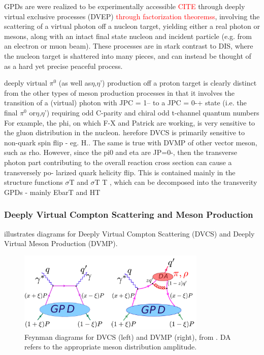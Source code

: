         GPDs are were realized to be experimentally accessible \textcolor{red}{CITE} through deeply virtual exclusive processes (DVEP) \textcolor{red}{through factorization theoremss}, involving the scattering of a virtual photon off a nucleon target, yielding either a real photon or mesons, along with an intact final state nucleon and incident particle (e.g. from an electron or muon beam). These processes are in stark contrast to DIS, where the nucleon target is shattered into many pieces, and can instead be thought of as a hard yet precise peaceful process. 


                     deeply
            virtual $\pi^0$ (as well as$\eta$,$\eta$') production off a proton target is clearly distinct from the other
            types of meson production processes in that it involves the transition of a (virtual) photon
            with JPC = 1– to a JPC = 0-+ state (i.e. the final $\pi^0$ or$\eta$,$\eta$’) requiring odd C-parity and
            chiral odd t-channel quantum numbers
For example, the phi, on which F-X and Patrick are
            working, is very sensitive to the gluon distribution in the nucleon.
herefore DVCS is
            primarily sensitive to non-quark spin flip - eg. H.. The same is true with DVMP of other
            vector meson, such as rho. However, since the pi0 and eta are JP=0-, then the transverse
            photon part contributing to the overall reaction cross section can cause a transversely po-
            larized quark helicity flip. This is contained mainly in the structure functions $\sigma$T and $\sigma$T T ,
            which can be decomposed into the transverity GPDs - mainly EbarT and HT
            

        \subsubsection*{Deeply Virtual Compton Scattering and Meson Production}
         illustrates diagrams for Deeply Virtual Compton Scattering (DVCS) and Deeply Virtual Meson Production (DVMP). 
    
        \begin{figure}[H]
            \centering
            \includegraphics[width=0.8\textwidth]{Chapters/Ch1-Intro/Ch1-Sec2-GPDs-DVMP/pics/valery_dvep.png}
            \caption[DVCS and DVMP Feynman Diagrams]{Feynman diagrams for DVCS (left) and DVMP (right), from  \parencite{Kubarovsky2011DeeplyCLAS}. DA refers to the appropriate meson distribution amplitude.}
            \label{fig:dvep_diagram}
        \end{figure}

